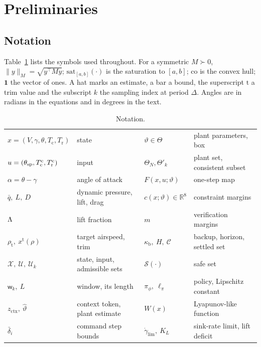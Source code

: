 \section{Preliminaries}\label{sec:prelim}
\subsection{Notation}
Table~\ref{tab:notation} lists the symbols used throughout. For a symmetric $M\succ0$, $\|y\|_M=\sqrt{y^{\!\top}My}$; $\mathrm{sat}_{[a,b]}(\cdot)$ is the saturation to $[a,b]$; $\mathrm{co}$ is the convex hull; $\mathbf 1$ the vector of ones. A hat marks an estimate, a bar a bound, the superscript $\mathrm t$ a trim value and the subscript $k$ the sampling index at period $\Delta$. Angles are in radians in the equations and in degrees in the text.
\begin{table}[t]\centering\footnotesize
\caption{Notation.}\label{tab:notation}
\setlength{\tabcolsep}{1.5pt}\scriptsize
\begin{tabular}{ll|ll}\toprule
$x=(V,\gamma,\theta,T_{\mathrm c},T_{\mathrm r})$ & state & $\vartheta\in\Theta$ & plant parameters, box\\
$u=(\theta_{\mathrm{sp}},T^{\mathrm c}_{\mathrm c},T^{\mathrm c}_{\mathrm r})$ & input & $\Theta_N,\Theta'_k$ & plant set, consistent subset\\
$\alpha=\theta-\gamma$ & angle of attack & $F(x,u;\vartheta)$ & one-step map\\
$\bar q,\ L,\ D$ & dynamic pressure, lift, drag & $c(x;\vartheta)\in\mathbb R^8$ & constraint margins\\
$\Lambda$ & lift fraction & $m$ & verification margins\\
$\rho_{\mathrm t},\ x^{\mathrm t}(\rho)$ & target airspeed, trim & $\kappa_{\mathrm b},\ H,\ \mathcal C$ & backup, horizon, settled set\\
$\mathcal X,\ \mathcal U,\ \mathcal U_k$ & state, input, admissible sets & $\mathcal S(\cdot)$ & safe set\\
$\mathsf w_k,\ L$ & window, its length & $\pi_\phi,\ \ell_\pi$ & policy, Lipschitz constant\\
$z_{\mathrm{ctx}},\ \hat\vartheta$ & context token, plant estimate & $W(x)$ & Lyapunov-like function\\
$\bar\delta_i$ & command step bounds & $\dot\gamma_{\lim},\ K_L$ & sink-rate limit, lift deficit\\
\bottomrule\end{tabular}\end{table}

